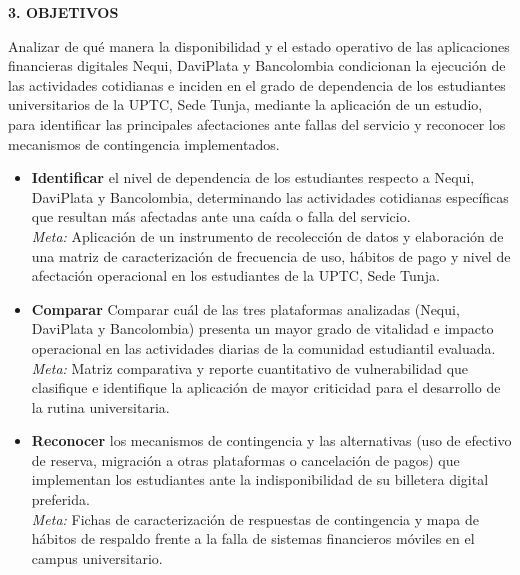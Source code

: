\hypertarget{sec:objetivos}{}%
\begin{center}
    {\Large\bfseries 3. OBJETIVOS}
\end{center}
\vspace{1em}

\par\vspace{0.5em}
Analizar de qué manera la disponibilidad y el estado operativo de las aplicaciones financieras digitales Nequi, DaviPlata y Bancolombia condicionan la ejecución de las actividades cotidianas e inciden en el grado de dependencia de los estudiantes universitarios de la UPTC, Sede Tunja, mediante la aplicación de un estudio, para identificar las principales afectaciones ante fallas del servicio y reconocer los mecanismos de contingencia implementados.

\vspace{1em}
\par\vspace{0.5em}
\begin{itemize}
    \item[\textbf{a)}] \textbf{Identificar} el nivel de dependencia de los estudiantes respecto a Nequi, DaviPlata y Bancolombia, determinando las actividades cotidianas específicas que resultan más afectadas ante una caída o falla del servicio.\\
    \textit{Meta:} Aplicación de un instrumento de recolección de datos y elaboración de una matriz de caracterización de frecuencia de uso, hábitos de pago y nivel de afectación operacional en los estudiantes de la UPTC, Sede Tunja.

    \item[\textbf{b)}] \textbf{Comparar} Comparar cuál de las tres plataformas analizadas (Nequi, DaviPlata y Bancolombia) presenta un mayor grado de vitalidad e impacto operacional en las actividades diarias de la comunidad estudiantil evaluada.\\
    \textit{Meta:} Matriz comparativa y reporte cuantitativo de vulnerabilidad que clasifique e identifique la aplicación de mayor criticidad para el desarrollo de la rutina universitaria.

    \item[\textbf{c)}] \textbf{Reconocer} los mecanismos de contingencia y las alternativas (uso de efectivo de reserva, migración a otras plataformas o cancelación de pagos) que implementan los estudiantes ante la indisponibilidad de su billetera digital preferida.\\
    \textit{Meta:} Fichas de caracterización de respuestas de contingencia y mapa de hábitos de respaldo frente a la falla de sistemas financieros móviles en el campus universitario.

\end{itemize}